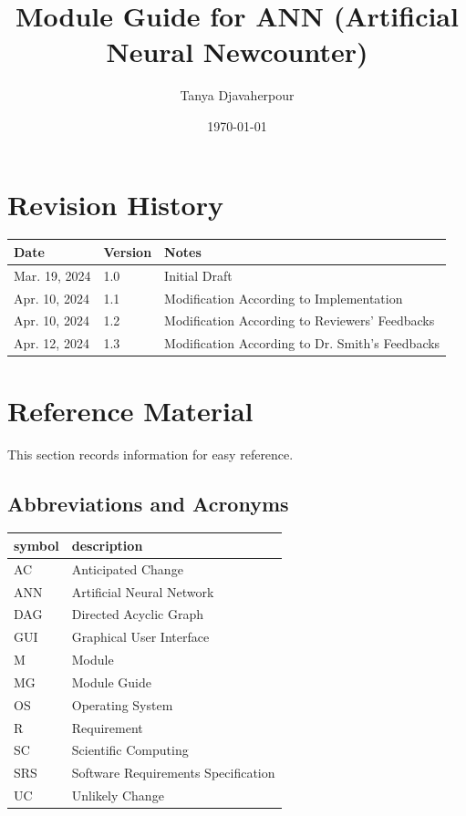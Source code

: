 \documentclass[12pt, titlepage]{article}
\begin{document}
\title{Module Guide for ANN (Artificial Neural Newcounter)} 
\author{Tanya Djavaherpour}
\date{\today}

\maketitle


\section{Revision History}

\begin{tabularx}{\textwidth}{p{3cm}p{2cm}X}
\toprule {\bf Date} & {\bf Version} & {\bf Notes}\\
\midrule
Mar. 19, 2024 & 1.0 & Initial Draft\\
Apr. 10, 2024 & 1.1 & Modification According to Implementation\\
Apr. 10, 2024 & 1.2 & Modification According to Reviewers' Feedbacks\\
Apr. 12, 2024 & 1.3 & Modification According to Dr. Smith's Feedbacks\\
\bottomrule
\end{tabularx}

\newpage

\section{Reference Material}

This section records information for easy reference.

\subsection{Abbreviations and Acronyms}

\renewcommand{\arraystretch}{1.2}
\begin{tabular}{l l} 
  \toprule		
  \textbf{symbol} & \textbf{description}\\
  \midrule 
  AC & Anticipated Change\\
  ANN & Artificial Neural Network\\
  DAG & Directed Acyclic Graph \\
  GUI & Graphical User Interface\\
  M & Module \\
  MG & Module Guide \\
  OS & Operating System \\
  R & Requirement\\
  SC & Scientific Computing \\
  SRS & Software Requirements Specification\\
  UC & Unlikely Change \\
  \bottomrule
\end{tabular}\\
\end{document}
